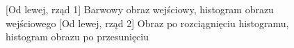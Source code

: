 \documentclass[a4paper,12pt, titlepage]{report}
\begin{document}
\FloatBarrier
\begin{figure}[h]
    \centering
    \qquad
    \caption{[Od lewej, rząd 1] Barwowy obraz wejściowy, histogram obrazu wejściowego [Od lewej, rząd 2] Obraz po rozciągnięciu histogramu, histogram obrazu po przesunięciu}%
    \label{fig:rysunek}%
\end{figure}
\FloatBarrier
\end{document}
